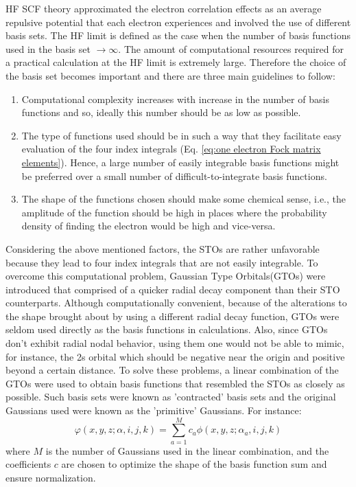             HF SCF theory approximated the electron correlation effects as an average repulsive potential that each electron experiences and involved the use of different basis sets. The HF limit is defined as the case when the number of basis functions used in the basis set $\to \infty$. The amount of computational resources required for a practical calculation at the HF limit is extremely large. Therefore the choice of the basis set becomes important and there are three main guidelines to follow:
            \begin{enumerate}
               \item Computational complexity increases with increase in the number of basis functions and so, ideally this number should be as low as possible.
               \item The type of functions used should be in such a way that they facilitate easy evaluation of the four index integrals (Eq. \eqref{eq:one electron Fock matrix elements}). Hence, a large number of easily integrable basis functions might be preferred over a small number of difficult-to-integrate basis functions.
               \item The shape of the functions chosen should make some chemical sense, i.e., the amplitude of the function should be high in places where the probability density of finding the electron would be high and vice-versa.
            \end{enumerate}

            Considering the above mentioned factors, the STOs are rather unfavorable because they lead to four index integrals that are not easily integrable. To overcome this computational problem, Gaussian Type Orbitals(GTOs) were introduced that comprised of a quicker radial decay component than their STO counterparts. Although computationally convenient, because of the alterations to the shape brought about by using a different radial decay function, GTOs were seldom used directly as the basis functions in calculations. Also, since GTOs don't exhibit radial nodal behavior, using them one would not be able to mimic, for instance, the 2s orbital which should be negative near the origin and positive beyond a certain distance. To solve these problems, a linear combination of the GTOs were used to obtain basis functions that resembled the STOs as closely as possible. Such basis sets were known as 'contracted' basis sets and the original Gaussians used were known as the 'primitive' Gaussians. For instance:
            \begin{equation}\label{eq:contracted}
               \varphi(x, y, z; {\alpha}, i, j, k) = \displaystyle\sum_{a = 1}^M c_a \phi(x, y, z; \alpha_a, i , j, k)
            \end{equation}
            where $M$ is the number of Gaussians used in the linear combination, and the coefficients $c$ are chosen to optimize the shape of the basis function sum and ensure normalization.

